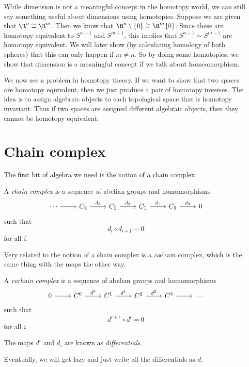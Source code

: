\documentclass[a4paper]{article}
\begin{document}
While dimension is not a meaningful concept in the homotopy world, we can still say something useful about dimensions using homotopies. Suppose we are given that $\R^n \cong \R^m$. Then we know that $\R^n \setminus \{0\} \cong \R^m \{0\}$. Since these are homotopy equivalent to $S^{n - 1}$ and $S^{m - 1}$, this implies that $S^{n - 1} \sim S^{m - 1}$ are homotopy equivalent. We will later show (by calculating homology of both spheres) that this can only happen if $m \not= n$. So by doing some homotopies, we show that dimension is a meaningful concept if we talk about homeomorphism.

We now see a problem in homotopy theory. If we want to show that two spaces are homotopy equivalent, then we just produce a pair of homotopy inverses. The idea is to assign algebraic objects to each topological space that is homotopy invariant. Thus if two spaces are assigned different algebraic objects, then they cannot be homotopy equivalent.

\section{Chain complex}
The first bit of algebra we need is the notion of a chain complex.
\begin{defi}
  A \emph{chain complex} is a sequence of abelian groups and homomorphisms
  \[
    \begin{tikzcd}
      \cdots \ar[r] & C_3 \ar[r, "d_3"] & C_2 \ar[r, "d_2"] & C_1 \ar[r, "d_1"] & C_0 \ar[r, "d_0"] & 0
    \end{tikzcd}
  \]
  such that
  \[
    d_i \circ d_{i + 1} = 0
  \]
  for all $i$.
\end{defi}

Very related to the notion of a chain complex is a \emph{co}chain complex, which is the same thing with the maps the other way.

\begin{defi}
  A \emph{cochain complex} is a sequence of abelian groups and homomorphisms
  \[
    \begin{tikzcd}
      0 \ar[r] & C^0 \ar[r, "d^0"] & C^1 \ar[r, "d^1"] & C^2 \ar[r, "d^2"] & C^3 \ar[r] & \cdots
    \end{tikzcd}
  \]
  such that
  \[
    d^{i + 1} \circ d^i = 0
  \]
  for all $i$.
\end{defi}

\begin{defi}[Differentials]
  The maps $d^i$ and $d_i$ are known as \emph{differentials}.
\end{defi}
Eventually, we will get lazy and just write all the differentials as $d$.
\end{document}
